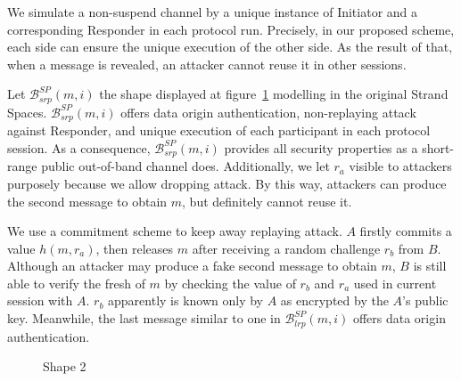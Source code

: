 We simulate a non-suspend channel by a unique instance of Initiator and a corresponding Responder in each protocol run. Precisely, in our proposed scheme, each side can ensure the unique execution of the other side. As the result of that, when a message is revealed, an attacker cannot reuse it in other sessions. 

Let $\mathcal{B}^{SP}_{srp}(m,i)$ the shape displayed at figure~\ref{protocol2} modelling in the original Strand Spaces. $\mathcal{B}^{SP}_{srp}(m,i)$ offers data origin authentication, non-replaying attack against Responder, and unique execution of each participant in each protocol session. As a consequence, $\mathcal{B}^{SP}_{srp}(m,i)$ provides all security properties as a short-range public out-of-band channel does. Additionally, we let $r_a$ visible to attackers purposely because we allow dropping attack. By this way, attackers can produce the second message to obtain $m$, but definitely cannot reuse it. 

We use a commitment scheme to keep away replaying attack. $A$ firstly commits a value $h(m,r_a)$, then releases $m$ after receiving a random challenge $r_b$ from $B$. Although an attacker may produce a fake second message to obtain $m$, $B$ is still able to verify the fresh of $m$ by checking the value of $r_b$ and $r_a$ used in current session with $A$. $r_b$ apparently is known only by $A$ as encrypted by the $A$'s public key. Meanwhile, the last message similar to one in $\mathcal{B}^{SP}_{lrp}(m,i)$ offers data origin authentication. 


\begin{figure}
\begin{center}
\end{center}
\caption{Shape 2} 
\label{protocol2}
\end{figure}

